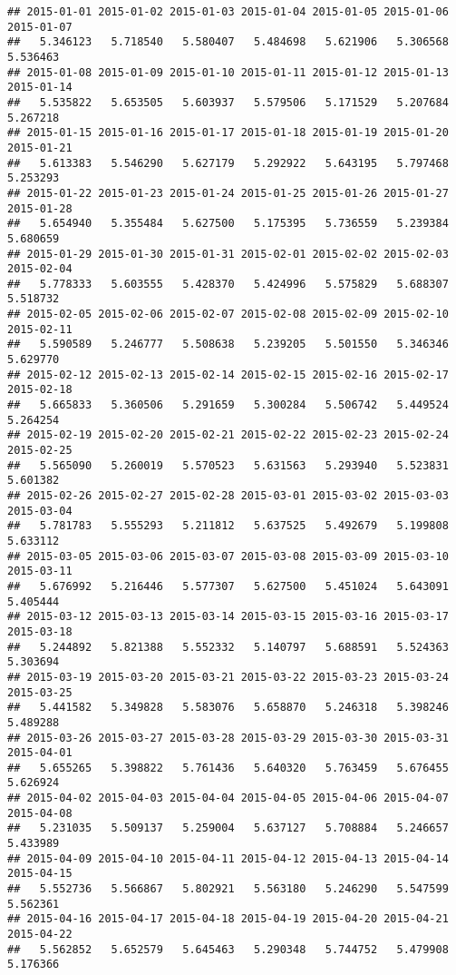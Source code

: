 \documentclass[
]{article}
\begin{document}
\begin{verbatim}
## 2015-01-01 2015-01-02 2015-01-03 2015-01-04 2015-01-05 2015-01-06 2015-01-07 
##   5.346123   5.718540   5.580407   5.484698   5.621906   5.306568   5.536463 
## 2015-01-08 2015-01-09 2015-01-10 2015-01-11 2015-01-12 2015-01-13 2015-01-14 
##   5.535822   5.653505   5.603937   5.579506   5.171529   5.207684   5.267218 
## 2015-01-15 2015-01-16 2015-01-17 2015-01-18 2015-01-19 2015-01-20 2015-01-21 
##   5.613383   5.546290   5.627179   5.292922   5.643195   5.797468   5.253293 
## 2015-01-22 2015-01-23 2015-01-24 2015-01-25 2015-01-26 2015-01-27 2015-01-28 
##   5.654940   5.355484   5.627500   5.175395   5.736559   5.239384   5.680659 
## 2015-01-29 2015-01-30 2015-01-31 2015-02-01 2015-02-02 2015-02-03 2015-02-04 
##   5.778333   5.603555   5.428370   5.424996   5.575829   5.688307   5.518732 
## 2015-02-05 2015-02-06 2015-02-07 2015-02-08 2015-02-09 2015-02-10 2015-02-11 
##   5.590589   5.246777   5.508638   5.239205   5.501550   5.346346   5.629770 
## 2015-02-12 2015-02-13 2015-02-14 2015-02-15 2015-02-16 2015-02-17 2015-02-18 
##   5.665833   5.360506   5.291659   5.300284   5.506742   5.449524   5.264254 
## 2015-02-19 2015-02-20 2015-02-21 2015-02-22 2015-02-23 2015-02-24 2015-02-25 
##   5.565090   5.260019   5.570523   5.631563   5.293940   5.523831   5.601382 
## 2015-02-26 2015-02-27 2015-02-28 2015-03-01 2015-03-02 2015-03-03 2015-03-04 
##   5.781783   5.555293   5.211812   5.637525   5.492679   5.199808   5.633112 
## 2015-03-05 2015-03-06 2015-03-07 2015-03-08 2015-03-09 2015-03-10 2015-03-11 
##   5.676992   5.216446   5.577307   5.627500   5.451024   5.643091   5.405444 
## 2015-03-12 2015-03-13 2015-03-14 2015-03-15 2015-03-16 2015-03-17 2015-03-18 
##   5.244892   5.821388   5.552332   5.140797   5.688591   5.524363   5.303694 
## 2015-03-19 2015-03-20 2015-03-21 2015-03-22 2015-03-23 2015-03-24 2015-03-25 
##   5.441582   5.349828   5.583076   5.658870   5.246318   5.398246   5.489288 
## 2015-03-26 2015-03-27 2015-03-28 2015-03-29 2015-03-30 2015-03-31 2015-04-01 
##   5.655265   5.398822   5.761436   5.640320   5.763459   5.676455   5.626924 
## 2015-04-02 2015-04-03 2015-04-04 2015-04-05 2015-04-06 2015-04-07 2015-04-08 
##   5.231035   5.509137   5.259004   5.637127   5.708884   5.246657   5.433989 
## 2015-04-09 2015-04-10 2015-04-11 2015-04-12 2015-04-13 2015-04-14 2015-04-15 
##   5.552736   5.566867   5.802921   5.563180   5.246290   5.547599   5.562361 
## 2015-04-16 2015-04-17 2015-04-18 2015-04-19 2015-04-20 2015-04-21 2015-04-22 
##   5.562852   5.652579   5.645463   5.290348   5.744752   5.479908   5.176366 

\end{verbatim}
\end{document}
